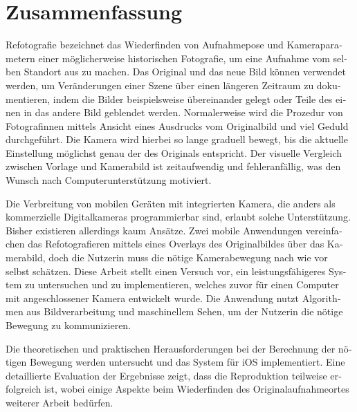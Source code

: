 \chapter*{Zusammenfassung}

\begin{otherlanguage}{german}

   Refotografie bezeichnet das Wiederfinden von Aufnahmepose und Kameraparametern
   einer möglicherweise historischen Fotografie, um eine Aufnahme vom selben
   Standort aus zu machen.  Das Original und das neue Bild
   können verwendet werden, um Veränderungen einer Szene über einen längeren
   Zeitraum zu dokumentieren, indem die Bilder beispielsweise übereinander gelegt
   oder Teile des einen in das andere Bild geblendet werden. Normalerweise wird die
   Prozedur von Fotografinnen mittels Ansicht eines Ausdrucks vom Originalbild und
   viel Geduld durchgeführt. Die Kamera wird hierbei so lange graduell bewegt, bis
   die aktuelle Einstellung möglichst genau der des Originals entspricht. Der
   visuelle Vergleich zwischen Vorlage und Kamerabild ist zeitaufwendig und
   fehleranfällig, was den Wunsch nach Computerunterstützung motiviert.

   Die Verbreitung von mobilen Geräten mit integrierten Kamera, die anders als
   kommerzielle Digitalkameras programmierbar sind, erlaubt solche Unterstützung.
   Bisher existieren allerdings kaum Ansätze. Zwei mobile Anwendungen vereinfachen 
   das Refotografieren mittels eines Overlays des Originalbildes über das
   Kamerabild, doch die Nutzerin muss die nötige Kamerabewegung nach wie vor selbst
   schätzen. Diese Arbeit stellt einen Versuch vor, ein leistungsfähigeres System
   zu untersuchen und zu implementieren, welches zuvor für
   einen Computer mit angeschlossener Kamera entwickelt wurde. Die Anwendung nutzt
   Algorithmen aus Bildverarbeitung und maschinellem Sehen, um der Nutzerin die
   nötige Bewegung zu kommunizieren.

   Die theoretischen und praktischen Herausforderungen bei der Berechnung der
   nötigen Bewegung werden untersucht und das System für iOS implementiert. Eine
   detaillierte Evaluation der Ergebnisse zeigt, dass die Reproduktion teilweise
   erfolgreich ist, wobei einige Aspekte beim Wiederfinden des
   Originalaufnahmeortes weiterer Arbeit bedürfen.

\end{otherlanguage}

